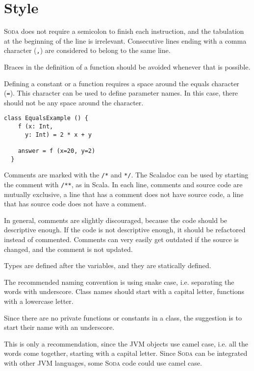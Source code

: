 \documentclass[12pt,a4paper]{book}
\newcommand{\srccode}[1]{\texttt{{#1}}}
\newcommand{\Soda}{\textsc{Soda}\xspace}
\begin{document}
    \section{Style}

    \Soda does not require a semicolon to finish each instruction, and the tabulation at the beginning of the line is irrelevant.
    Consecutive lines ending with a comma character (\srccode{,}) are considered to belong to the same line.

    Braces in the definition of a function should be avoided whenever that is possible.

    Defining a constant or a function requires a space around the equals character (\srccode{=}).
    This character can be used to define parameter names.
    In this case, there should not be any space around the character.

    \begin{lstlisting}[label={lst:exampleFunctionWithoutBraces}]
  class EqualsExample () {
    f (x: Int,
      y: Int) = 2 * x + y

    answer = f (x=20, y=2)
  }
    \end{lstlisting}

    Comments are marked with the \srccode{/*} and  \srccode{*/}.
    The Scaladoc can be used by starting the comment with \srccode{/**}, as in Scala.
    In each line, comments and source code are mutually exclusive, a line that has a comment does not have source code, a line that has source code does not have a comment.

    In general, comments are slightly discouraged, because the code should be descriptive enough.
    If the code is not descriptive enough, it should be refactored instead of commented.
    Comments can very easily get outdated if the source is changed, and the comment is not updated.

    Types are defined after the variables, and they are statically defined.

    The recommended naming convention is using snake case, i.e. separating the words with underscore.
    Class names should start with a capital letter, functions with a lowercase letter.

    Since there are no private functions or constants in a class, the suggestion is to start their name with an underscore.

    This is only a recommendation, since the JVM objects use camel case, i.e. all the words come together, starting with a capital letter.
    Since \Soda can be integrated with other JVM languages, some \Soda code could use camel case.
\end{document}
